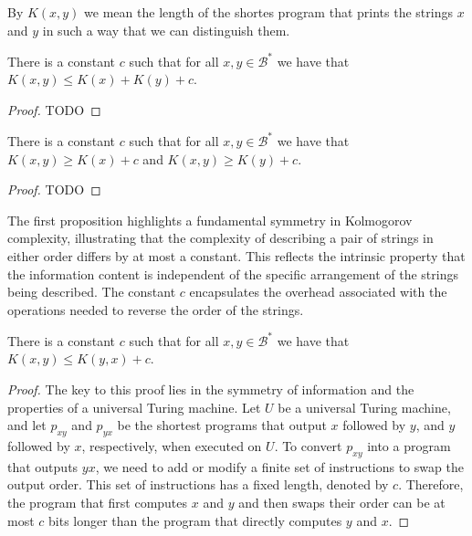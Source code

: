 By $K(x, y)$ we mean the length of the shortes program that prints the strings $x$ and $y$ in such a way that we can distinguish them.

\begin{proposition}
\label{prop:additive_kolmogorov}
There is a constant $c$ such that for all $x, y \in\mathcal{B}^{\ast}$ we have that $K(x, y) \leq K(x) + K(y) + c$.
\end{proposition}
\begin{proof}
{\color{red} TODO}
\end{proof}

\begin{proposition}
\label{prop:excess_kolmogorov}
There is a constant $c$ such that for all $x, y \in\mathcal{B}^{\ast}$ we have that $K(x, y) \geq K(x) + c$ and $K(x, y) \geq K(y) + c$.
\end{proposition}
\begin{proof}
{\color{red} TODO}
\end{proof}

The first proposition highlights a fundamental symmetry in Kolmogorov complexity, illustrating that the complexity of describing a pair of strings in either order differs by at most a constant. This reflects the intrinsic property that the information content is independent of the specific arrangement of the strings being described. The constant \(c\) encapsulates the overhead associated with the operations needed to reverse the order of the strings.

\begin{proposition}
\label{prop:kolmogorov_order}
There is a constant $c$ such that for all $x, y \in\mathcal{B}^{\ast}$ we have that $K(x, y) \leq K(y, x) + c$.
\end{proposition}
\begin{proof}
The key to this proof lies in the symmetry of information and the properties of a universal Turing machine. Let $U$ be a universal Turing machine, and let $p_{xy}$ and $p_{yx}$ be the shortest programs that output $x$ followed by $y$, and $y$ followed by $x$, respectively, when executed on $U$. To convert $p_{xy}$ into a program that outputs $yx$, we need to add or modify a finite set of instructions to swap the output order. This set of instructions has a fixed length, denoted by $c$. Therefore, the program that first computes $x$ and $y$ and then swaps their order can be at most $c$ bits longer than the program that directly computes $y$ and $x$.
\end{proof}

